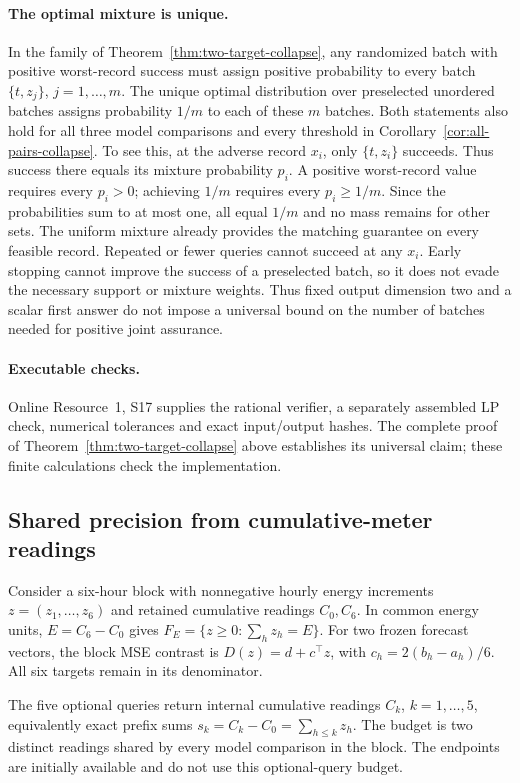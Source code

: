 \documentclass[12pt]{article}
\begin{document}
\paragraph{The optimal mixture is unique.}
In the family of Theorem~\ref{thm:two-target-collapse}, any randomized
batch with positive worst-record success must assign positive probability
to every batch $\{t,z_j\}$, $j=1,\ldots,m$. The unique optimal distribution
over preselected unordered batches assigns probability $1/m$ to each of these
$m$ batches. Both statements also hold for all three model comparisons and
every threshold in Corollary~\ref{cor:all-pairs-collapse}.
To see this, at the adverse record $x_i$, only $\{t,z_i\}$ succeeds.
Thus success there equals its mixture probability $p_i$. A positive
worst-record value requires every $p_i>0$; achieving $1/m$ requires every
$p_i\geq1/m$. Since the probabilities sum to at most one, all equal
$1/m$ and no mass remains for other sets. The uniform mixture already
provides the matching guarantee on every feasible record.
Repeated or fewer queries cannot succeed at any $x_i$. Early stopping
cannot improve the success of a preselected batch, so it does not evade
the necessary support or mixture weights. Thus fixed output dimension two
and a scalar first answer do not impose a universal bound on the number
of batches needed for positive joint assurance.

\paragraph{Executable checks.}
Online Resource~1, S17 supplies the rational verifier, a separately assembled
LP check, numerical tolerances and exact input/output hashes. The complete
proof of Theorem~\ref{thm:two-target-collapse} above establishes its universal
claim; these finite calculations check the implementation.
\subsection{Shared precision from cumulative-meter readings}
\label{sec:counter-precision-method}
Consider a six-hour block with nonnegative hourly energy increments
$z=(z_1,\ldots,z_6)$ and retained cumulative readings $C_0,C_6$.
In common energy units, $E=C_6-C_0$ gives
$F_E=\{z\geq0:\sum_hz_h=E\}$. For two frozen forecast vectors,
the block MSE contrast is $D(z)=d+c^\top z$, with
$c_h=2(b_h-a_h)/6$. All six targets remain in its denominator.

The five optional queries return internal cumulative readings $C_k$,
$k=1,\ldots,5$, equivalently exact prefix sums
$s_k=C_k-C_0=\sum_{h\leq k}z_h$. The budget is two distinct readings
shared by every model comparison in the block. The endpoints are initially
available and do not use this optional-query budget.
\end{document}
